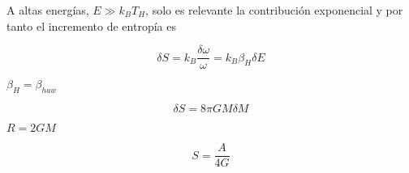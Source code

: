 A altas energías, $E \gg k_B T_H$, solo es relevante la contribución exponencial y por 
tanto el incremento de entropía es

\begin{equation}
  \delta S = k_B  \frac{\delta \omega}{\omega} = k_B \beta_H \delta E
\end{equation}

$\beta_H = \beta_{haw}$

\begin{equation}
  \delta S =  8\pi GM\delta M
\end{equation}

 $R=2GM$

\begin{equation}
  S=\frac{A}{4G}
\end{equation}
